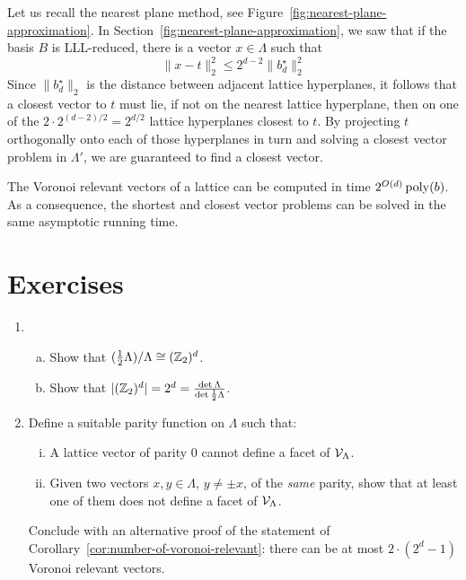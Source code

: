 Let us recall the nearest plane method, see Figure~\ref{fig:nearest-plane-approximation}.
In Section~\ref{fig:nearest-plane-approximation},
we saw that if the basis $B$ is LLL-reduced,
there is a vector $x \in \Lambda$ such that
\[
  \|x-t\|_2^2 \leq 2^{d-2} \|b_d^\star\|_2^2
\]
Since $\|b_d^\star\|_2$ is the distance between adjacent lattice hyperplanes,
it follows that a closest vector to $t$ must lie,
if not on the nearest lattice hyperplane,
then on one of the $2 \cdot 2^{(d-2)/2} = 2^{d/2}$ lattice hyperplanes closest to $t$.
By projecting $t$ orthogonally onto each of those hyperplanes in turn
and solving a closest vector problem in $\Lambda'$,
we are guaranteed to find a closest vector.

\begin{theorem}
  The Voronoi relevant vectors of a lattice can be computed in time $2^{O(d)} \operatorname{poly}(b)$.
  As a consequence, the shortest and closest vector problems can be solved in the same asymptotic
  running time.
\end{theorem}






\section*{Exercises}

\begin{enumerate}
  \item
    \begin{enumerate}[(a)]
    \item Show that $(\frac{1}{2} \Lambda) / \Lambda \cong (\mathbb{Z}_2)^d$.

    \item Show that $|(\mathbb{Z}_2)^d| = 2^d = \frac{\det\Lambda}{\det \frac{1}{2} \Lambda}$.
    \end{enumerate}

  \item
    Define a suitable parity function on $\Lambda$ such that:
    \begin{enumerate}[(i)]
      \item A lattice vector of parity $0$ cannot define a facet of $\mathcal{V}_\Lambda$.

      \item Given two vectors $x, y \in \Lambda$, $y \neq \pm x$, of the \emph{same} parity,
        show that at least one of them does not define a facet of $\mathcal{V}_\Lambda$.
    \end{enumerate}
    Conclude with an alternative proof of the statement of Corollary~\ref{cor:number-of-voronoi-relevant}:
    there can be at most $2 \cdot (2^d - 1)$ Voronoi relevant vectors.
\end{enumerate}
